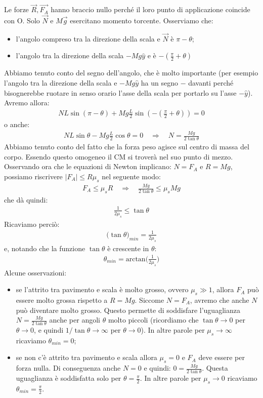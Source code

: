 \documentclass[12pt,a4paper]{book}
\begin{document}
Le forze $\vec{R}, \vec{F_A}$ hanno braccio nullo perché il loro punto di applicazione coincide con O.  Solo $\vec{N}$ e $M \vec{g}$ esercitano momento torcente. 
Osserviamo che: 
\begin{itemize}
\item l'angolo compreso tra la direzione della scala e $\vec{N}$ è $\pi - \theta$;
\item l'angolo tra la direzione della scala $-Mg\hat{y}$ e è $-(\frac{\pi}{2}+\theta)$
\end{itemize} 
Abbiamo tenuto conto del segno dell'angolo, che è molto importante (per esempio l'angolo tra la direzione della scala e $-Mg\hat{y}$
ha un segno $-$ davanti perché bisognerebbe ruotare in senso orario l'asse della scala per portarlo su l'asse $-\hat{y}$). 
Avremo allora:
\begin{gather*}
NL\sin (\pi-\theta) + Mg \frac{L}{2}\sin (-(\frac{\pi}{2}+\theta))  =0 
\end{gather*}
o anche:
\begin{gather*}
NL\sin \theta - Mg \frac{L}{2} \cos \theta =0 \quad \Rightarrow \quad N=\frac{Mg}{2 \tan \theta}
\end{gather*}
Abbiamo tenuto conto del fatto che la forza peso agisce sul centro di massa del corpo. Essendo questo 
omogeneo il CM si troverà nel suo punto di mezzo. Osservando ora che le equazioni di Newton implicano:
$N=F_A$ e $R=Mg$, possiamo riscrivere $|F_A|\leq R \mu_s$ nel seguente modo:
\begin{gather*}
F_A \leq \mu_s R \quad \Rightarrow \quad \frac{Mg}{2 \tan \theta} \leq \mu_s Mg
\end{gather*}
che dà quindi:
\begin{gather*}
\frac{1}{2\mu_s} \leq\tan \theta
\end{gather*}
Ricaviamo perciò: 
\begin{gather*}
\big(\tan \theta\big)_{min}=\frac{1}{2\mu_s} 
\end{gather*}
e, notando che la funzione $\tan \theta$ è crescente in $\theta$:
\begin{gather*}
\theta_{min}=\text{arctan}\big(\frac{1}{2\mu_s}\big)
\end{gather*}
Alcune osservazioni:
\begin{itemize}
\item se l'attrito tra pavimento e scala è molto grosso, ovvero $\mu_s\gg 1$, allora $F_A$ può essere molto grossa 
rispetto a $R=Mg$. Siccome $N=F_A$, avremo che anche $N$ può diventare molto grosso. Questo permette di soddisfare l'uguaglianza
$N=\frac{Mg}{2 \tan \theta}$ anche per angoli $\theta$ molto piccoli (ricordiamo che $\tan \theta \rightarrow 0$ per $\theta \rightarrow 0$, e quindi $1/\tan \theta \rightarrow \infty$ per $\theta \rightarrow 0$). In altre parole per $\mu_s \rightarrow \infty$ ricaviamo $\theta_{min}=0$;
\item se non c'è attrito tra pavimento e scala allora $\mu_s=0$ e $F_A$ deve essere per forza nulla. Di conseguenza anche $N=0$ e quindi:
$0=\frac{Mg}{2 \tan \theta}$. Questa uguaglianza è soddisfatta solo per $\theta=\frac{\pi}{2}$. In altre parole per $\mu_s \rightarrow 0$ ricaviamo $\theta_{min}=\frac{\pi}{2}$.
\end{itemize}
\end{document}
